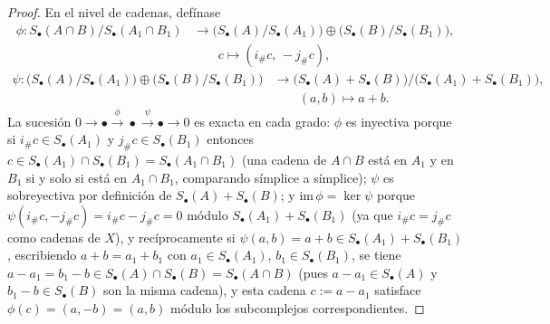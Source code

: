 \documentclass[11pt,a4paper]{article}
\theoremstyle{plain}
\theoremstyle{definition}
\theoremstyle{remark}
\begin{document}
\begin{proof}
En el nivel de cadenas, defínase
\[
\begin{aligned}
\phi:S_\bullet(A\cap B)/S_\bullet(A_1\cap B_1)&\to \big(S_\bullet(A)/S_\bullet(A_1)\big)\oplus\big(S_\bullet(B)/S_\bullet(B_1)\big),\\
&\qquad c\mapsto(i_\#c,\,-j_\#c),
\end{aligned}
\]
\[
\begin{aligned}
\psi:\big(S_\bullet(A)/S_\bullet(A_1)\big)\oplus\big(S_\bullet(B)/S_\bullet(B_1)\big)&\to\big(S_\bullet(A)+S_\bullet(B)\big)/\big(S_\bullet(A_1)+S_\bullet(B_1)\big),\\
&\qquad (a,b)\mapsto a+b.
\end{aligned}
\]
La sucesión $0\to\bullet\xrightarrow{\phi}\bullet\xrightarrow{\psi}\bullet\to0$
es exacta en cada grado: $\phi$ es inyectiva porque si
$i_\#c\in S_\bullet(A_1)$ y $j_\#c\in S_\bullet(B_1)$ entonces
$c\in S_\bullet(A_1)\cap S_\bullet(B_1)=S_\bullet(A_1\cap B_1)$ (una cadena
de $A\cap B$ está en $A_1$ y en $B_1$ si y solo si está en
$A_1\cap B_1$, comparando símplice a símplice); $\psi$ es sobreyectiva por
definición de $S_\bullet(A)+S_\bullet(B)$; y
$\mathrm{im}\,\phi=\ker\psi$ porque $\psi(i_\#c,-j_\#c)=i_\#c-j_\#c=0$
módulo $S_\bullet(A_1)+S_\bullet(B_1)$ (ya que $i_\#c=j_\#c$ como cadenas
de $X$), y recíprocamente si $\psi(a,b)=a+b\in S_\bullet(A_1)+S_\bullet(B_1)$,
escribiendo $a+b=a_1+b_1$ con $a_1\in S_\bullet(A_1)$, $b_1\in S_\bullet(B_1)$,
se tiene $a-a_1=b_1-b\in S_\bullet(A)\cap S_\bullet(B)=S_\bullet(A\cap B)$
(pues $a-a_1\in S_\bullet(A)$ y $b_1-b\in S_\bullet(B)$ son la misma
cadena), y esta cadena $c:=a-a_1$ satisface $\phi(c)=(a,-b)=(a,b)$ módulo
los subcomplejos correspondientes.


\end{proof}
\end{document}
